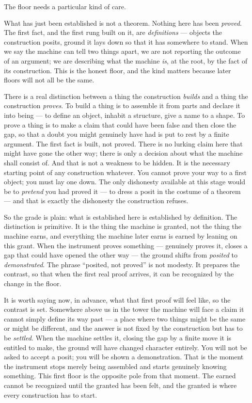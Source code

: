 The floor needs a particular kind of care.

What has just been established is not a theorem. Nothing here has been \emph{proved}. The first fact, and the
first rung built on it, are \emph{definitions} --- objects the construction posits, ground it lays down
so that it has somewhere to stand. When we say the machine can tell two things apart, we are not reporting the
outcome of an argument; we are describing what the machine \emph{is}, at the root, by the fact of its
construction. This is the honest floor, and the kind matters because later floors will not all be the same.

There is a real distinction between a thing the construction \emph{builds} and a thing the construction
\emph{proves}. To build a thing is to assemble it from parts and declare it into being --- to define an object,
inhabit a structure, give a name to a shape. To prove a thing is to make a claim that could have been false and
then close the gap, so that a doubt you might genuinely have had is put to rest by a finite argument. The first
fact is built, not proved. There is no lurking claim here that might have gone the other way; there is only a
decision about what the machine shall consist of. And that is not a weakness to be hidden. It is the necessary
starting point of any construction whatever. You cannot prove your way to a first object; you must lay one down.
The only dishonesty available at this stage would be to \emph{pretend} you had proved it --- to dress a posit in
the costume of a theorem --- and that is exactly the dishonesty the construction refuses.

So the grade is plain: what is established here is established by definition. The distinction is primitive. It is
the thing the machine is granted, not the thing the machine earns, and everything the machine later earns is
earned by leaning on this grant. When the instrument proves something --- genuinely proves it, closes a gap that
could have opened the other way --- the ground shifts from \emph{posited} to \emph{demonstrated}. The phrase
``posited, not proved'' is not modesty. It prepares the contrast, so that when the first real proof arrives, it
can be recognized by the change in the floor.

It is worth saying now, in advance, what that first proof will feel like, so the contrast is set. Somewhere above
us in the tower the machine will face a claim it cannot simply define its way past --- a place where two things
might be the same or might be different, and the answer is not fixed by the construction but has to be
\emph{settled}. When the machine settles it, closing the gap by a finite move it is entitled to make, the ground
will have changed character entirely. You will not be asked to accept a posit; you will be shown a demonstration.
That is the moment the instrument stops merely being assembled and starts genuinely knowing something. This first
floor is the opposite pole from that moment. The earned cannot be recognized until the granted has been felt, and
the granted is where every construction has to start.

